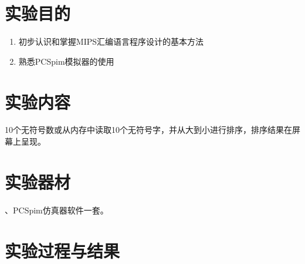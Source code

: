 \documentclass[12pt,UTF8]{ctexart}
\newcommand{\wuhao}{\fontsize{10.5pt}{\baselineskip}\selectfont}
\begin{document}
\begin{spacing}{1.1}
\wuhao
\section{实验目的}
\begin{enumerate}
	\item 初步认识和掌握MIPS汇编语言程序设计的基本方法
	\item 熟悉PCSpim模拟器的使用
\end{enumerate}


\section{实验内容}
10个无符号数或从内存中读取10个无符号字，并从大到小进行排序，排序结果在屏幕上呈现。


\section{实验器材}
、PCSpim仿真器软件一套。


\section{实验过程与结果}

\end{spacing}
\end{document}
